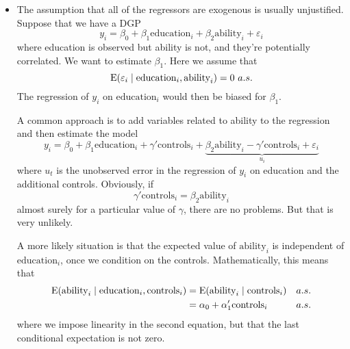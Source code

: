 \begin{itemize}[leftmargin=0pt]

\item The assumption that all of the regressors are exogenous is
  usually unjustified. Suppose that we have a DGP
  \begin{equation*}
    y_i = \beta_0 + \beta_1 \text{education}_i
    + \beta_2 \text{ability}_i + \varepsilon_i
  \end{equation*}
  where education is observed but ability is not, and they're
  potentially correlated. We want to estimate $\beta_1$. Here we
  assume that
  \begin{equation*}
    \operatorname{E}(\varepsilon_i \mid \text{education}_i, \text{ability}_i) = 0 \ a.s.
  \end{equation*}
  The regression of $y_i$ on $\text{education}_i$ would then be biased
  for $\beta_1$.

  A common approach is to add variables related to ability to the
  regression and then estimate the model
  \begin{equation*}
    y_i = \beta_0 + \beta_1 \text{education}_i
    + \gamma'\text{controls}_i
    + \underbrace{\beta_2 \text{ability}_i - 
                  \gamma'\text{controls}_i + \varepsilon_i}_{u_i}
  \end{equation*}
  where $u_t$ is the unobserved error in the regression of $y_i$ on
  education and the additional controls. Obviously, if
  \begin{equation*}
    \gamma'\text{controls}_i = \beta_2 \text{ability}_i
  \end{equation*}
  almost surely for a particular value of $\gamma$, there are no
  problems. But that is very unlikely.

  A more likely situation is that the expected value of
  $\text{ability}_i$ is independent of $\text{education}_i$, once we
  condition on the controls. Mathematically, this means that
  \begin{align*}
    \operatorname{E}(\text{ability}_i \mid \text{education}_i, \text{controls}_i)
    &= \operatorname{E}(\text{ability}_i \mid \text{controls}_i) && a.s. \\
    &= \alpha_0 + \alpha_1'\text{controls}_i && a.s.
  \end{align*}
  where we impose linearity in the second equation, but that the last
  conditional expectation is not zero.


\end{itemize}
